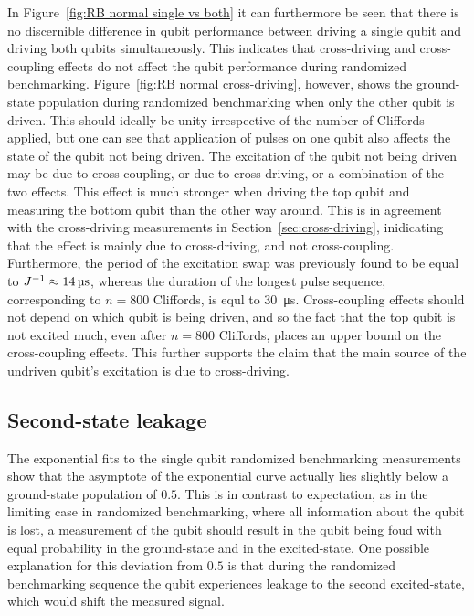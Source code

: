         In Figure~\ref{fig:RB normal single vs both} it can furthermore be seen that there is no discernible difference in qubit performance between driving a single qubit and driving both qubits simultaneously. This indicates that cross-driving and cross-coupling effects do not affect the qubit performance during randomized benchmarking. Figure~\ref{fig:RB normal cross-driving}, however, shows the ground-state population during randomized benchmarking when only the other qubit is driven. This should ideally be unity irrespective of the number of Cliffords applied, but one can see that application of pulses on one qubit also affects the state of the qubit not being driven. The excitation of the qubit not being driven may be due to cross-coupling, or due to cross-driving, or a combination of the two effects. This effect is much stronger when driving the top qubit and measuring the bottom qubit than the other way around. This is in agreement with the cross-driving measurements in Section~\ref{sec:cross-driving}, inidicating that the effect is mainly due to cross-driving, and not cross-coupling. Furthermore, the period of the excitation swap was previously found to be equal to $J^{-1} \approx \text{\ensuremath{\SI{14}{\micro \second}}}$, whereas the duration of the longest pulse sequence, corresponding to $n=800$ Cliffords, is equl to \SI{30}{\micro \second}. Cross-coupling effects should not depend on which qubit is being driven, and so the fact that the top qubit is not excited much, even after $n=800$ Cliffords, places an upper bound on the cross-coupling effects. This further supports the claim that the main source of the undriven qubit's excitation is due to cross-driving.

      \subsection{Second-state leakage}
        \label{ssec:Second-state leakage}
        The exponential fits to the single qubit randomized benchmarking measurements show that the asymptote of the exponential curve actually lies slightly below a ground-state population of $0.5$. This is in contrast to expectation, as in the limiting case in randomized benchmarking, where all information about the qubit is lost, a measurement of the qubit should result in the qubit being foud with equal probability in the ground-state and in the excited-state. One possible explanation for this deviation from $0.5$ is that during the randomized benchmarking sequence the qubit experiences leakage to the second excited-state, which would shift the measured signal.

